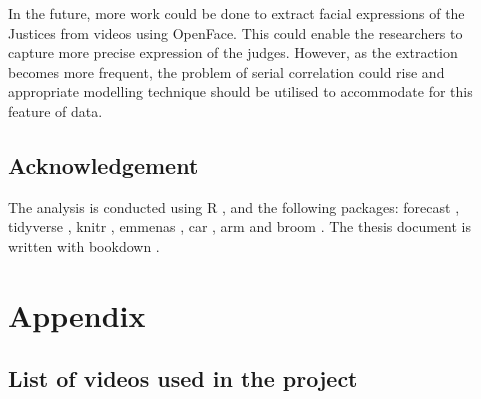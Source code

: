 \documentclass{monashthesis}
\begin{document}
In the future, more work could be done to extract facial expressions of the Justices from videos using OpenFace. This could enable the researchers to capture more precise expression of the judges. However, as the extraction becomes more frequent, the problem of serial correlation could rise and appropriate modelling technique should be utilised to accommodate for this feature of data.

\hypertarget{acknowledgement}{%
\section{Acknowledgement}\label{acknowledgement}}

The analysis is conducted using R \autocite{Rlanguage}, and the following packages: forecast \autocite{forecast}, tidyverse \autocite{tidyverse}, knitr \autocite{knitr}, emmenas \autocite{emmeans}, car \autocite{car}, arm \autocite{arm} and broom \autocite{broom}. The thesis document is written with bookdown \autocite{bookdown}.

\appendix

\hypertarget{appendix}{%
\chapter{Appendix}\label{appendix}}

\hypertarget{list-of-videos-used-in-the-project}{%
\section{List of videos used in the project}\label{list-of-videos-used-in-the-project}}
\end{document}
